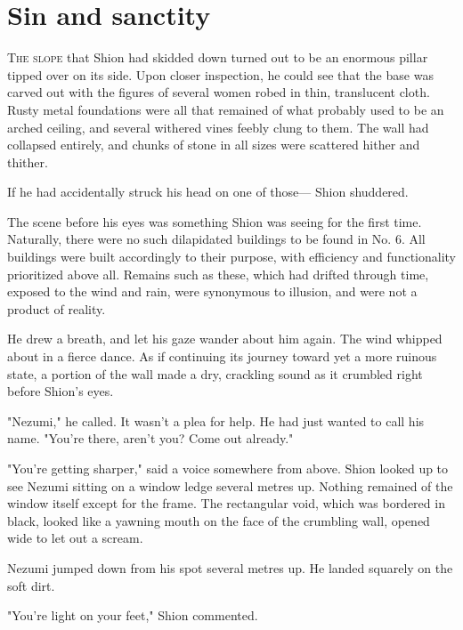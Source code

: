 
\chapter{Sin and sanctity}


\lettrine{T}{he slope} that Shion had skidded down turned out to be an enormous
pillar tipped over on its side. Upon closer inspection, he could see
that the base was carved out with the figures of several women robed in
thin, translucent cloth. Rusty metal foundations were all that remained
of what probably used to be an arched ceiling, and several withered
vines feebly clung to them. The wall had collapsed entirely, and chunks
of stone in all sizes were scattered hither and thither.

If he had accidentally struck his head on one of those--- Shion shuddered.

The scene before his eyes was something Shion was seeing for the first
time. Naturally, there were no such dilapidated buildings to be found in
No. 6. All buildings were built accordingly to their purpose, with
efficiency and functionality prioritized above all. Remains such as
these, which had drifted through time, exposed to the wind and rain,
were synonymous to illusion, and were not a product of reality.

He drew a breath, and let his gaze wander about him again. The wind
whipped about in a fierce dance. As if continuing its journey toward yet
a more ruinous state, a portion of the wall made a dry, crackling sound
as it crumbled right before Shion's eyes.

"Nezumi," he called. It wasn't a plea for help. He had just wanted to
call his name. "You're there, aren't you? Come out already."

"You're getting sharper," said a voice somewhere from above. Shion
looked up to see Nezumi sitting on a window ledge several metres up.
Nothing remained of the window itself except for the frame. The
rectangular void, which was bordered in black, looked like a yawning
mouth on the face of the crumbling wall, opened wide to let out a
scream.

Nezumi jumped down from his spot several metres up. He landed squarely
on the soft dirt.

"You're light on your feet," Shion commented.

